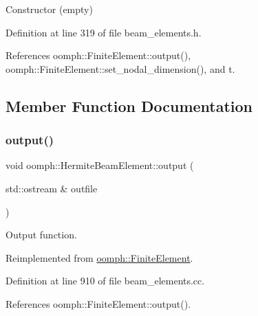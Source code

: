 Constructor (empty) 



Definition at line 319 of file beam\+\_\+elements.\+h.



References oomph\+::\+Finite\+Element\+::output(), oomph\+::\+Finite\+Element\+::set\+\_\+nodal\+\_\+dimension(), and t.



\subsection{Member Function Documentation}
\mbox{\label{classoomph_1_1HermiteBeamElement_a4e17bcc85c99e50a676998555151168a}} 
\subsubsection{\texorpdfstring{output()}{output()}\hspace{0.1cm}{\footnotesize\ttfamily [1/6]}}
{\footnotesize\ttfamily void oomph\+::\+Hermite\+Beam\+Element\+::output (\begin{DoxyParamCaption}\item[{std\+::ostream \&}]{outfile }\end{DoxyParamCaption})\hspace{0.3cm}{\ttfamily [virtual]}}



Output function. 



Reimplemented from \hyperlink{classoomph_1_1FiniteElement_a2ad98a3d2ef4999f1bef62c0ff13f2a7}{oomph\+::\+Finite\+Element}.



Definition at line 910 of file beam\+\_\+elements.\+cc.



References oomph\+::\+Finite\+Element\+::output().

\mbox{\label{classoomph_1_1HermiteBeamElement_a57da5131fb8e21c6b4774f634492cbbf}} 
